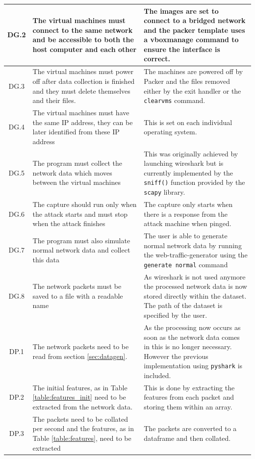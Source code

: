\begin{tabularx}{\textwidth}{|c|X|X|}
     \hline
     DG.2 & The virtual machines must connect to the same network and be accessible to both the host computer and each other & The images are set to connect to a bridged network and the packer template uses a vboxmanage command to ensure the interface is correct.\\
     \hline
     DG.3 & The virtual machines must power off after data collection is finished and they must delete themselves and their files. & The machines are powered off by Packer and the files removed either by the exit handler or the \texttt{clearvms} command. \\
     \hline
     DG.4 & The virtual machines must have the same IP address, they can be later identified from these IP address & This is set on each individual operating system.\\
     \hline
     DG.5 & The program must collect the network data which moves between the virtual machines & This was originally achieved by launching wireshark but is currently implemented by the \texttt{sniff()} function provided by the \texttt{scapy} library.  \\
     \hline
     DG.6 & The capture should run only when the attack starts and must stop when the attack finishes & The capture only starts when there is a response from the attack machine when pinged.\\
     \hline
     DG.7 & The program must also simulate normal network data and collect this data & The user is able to generate normal network data by running the web-traffic-generator using the \texttt{generate normal} command\\
     \hline
     DG.8 & The network packets must be saved to a file with a readable name & As wireshark is not used anymore the processed network data is now stored directly within the dataset. The path of the dataset is specified by the user. \\
     \hline
     DP.1 & The network packets need to be read from section \ref{sec:datagen}. & As the processing now occurs as soon as the network data comes in this is no longer necessary. However the previous implementation using \texttt{pyshark} is included. \\
     \hline
     DP.2 & The initial features, as in Table \ref{table:features_init} need to be extracted from the network data. & This is done by extracting the features from each packet and storing them within an array. \\
     \hline
     DP.3 & The packets need to be collated per second and the features, as in Table \ref{table:features}, need to be extracted & The packets are converted to a dataframe and then collated.\\

\end{tabularx}
